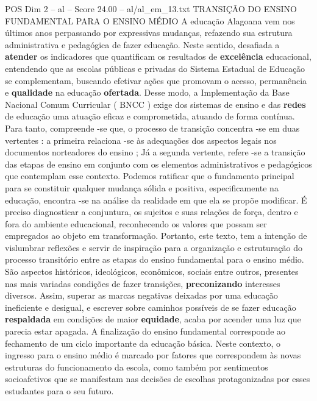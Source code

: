 \begin{textsample}{POS Dim 2 – al – Score 24.00 – al/al\_em\_13.txt}  \label{ex:f2_pos_266}
TRANSIÇÃO DO ENSINO FUNDAMENTAL PARA O ENSINO MÉDIO A educação Alagoana vem nos últimos anos perpassando por expressivas mudanças, refazendo sua estrutura administrativa e pedagógica de fazer educação.
Neste sentido, desafiada a \textbf{atender} os indicadores que quantificam os resultados de \textbf{excelência} educacional, entendendo que as escolas públicas e privadas do Sistema Estadual de Educação se complementam, buscando efetivar ações que promovam o acesso, permanência e \textbf{qualidade} na educação \textbf{ofertada}.
Desse modo, a Implementação da Base Nacional Comum Curricular ( BNCC ) exige dos sistemas de ensino e das \textbf{redes} de educação uma atuação eficaz e comprometida, atuando de forma contínua.
Para tanto, compreende -se que, o processo de transição concentra -se em duas vertentes : a primeira relaciona -se às adequações dos aspectos legais nos documentos norteadores do ensino ; Já a segunda vertente, refere -se a transição das etapas de ensino em conjunto com os elementos administrativos e pedagógicos que contemplam esse contexto.
Podemos ratificar que o fundamento principal para se constituir qualquer mudança sólida e positiva, especificamente na educação, encontra -se na análise da realidade em que ela se propõe modificar.
É preciso diagnosticar a conjuntura, os sujeitos e suas relações de força, dentro e fora do ambiente educacional, reconhecendo os valores que possam ser empregados ao objeto em transformação.
Portanto, este texto, tem a intenção de vislumbrar reflexões e servir de inspiração para a organização e estruturação do processo transitório entre as etapas do ensino fundamental para o ensino médio.
São aspectos históricos, ideológicos, econômicos, sociais entre outros, presentes nas mais variadas condições de fazer transições, \textbf{preconizando} interesses diversos.
Assim, superar as marcas negativas deixadas por uma educação ineficiente e desigual, e escrever sobre caminhos possíveis de se fazer educação \textbf{respaldada} em condições de maior \textbf{equidade}, acaba por acender uma luz que parecia estar apagada.
A finalização do ensino fundamental corresponde ao fechamento de um ciclo importante da educação básica.
Neste contexto, o ingresso para o ensino médio é marcado por fatores que correspondem às novas estruturas do funcionamento da escola, como também por sentimentos socioafetivos que se manifestam nas decisões de escolhas protagonizadas por esses estudantes para o seu futuro.

\end{textsample}
